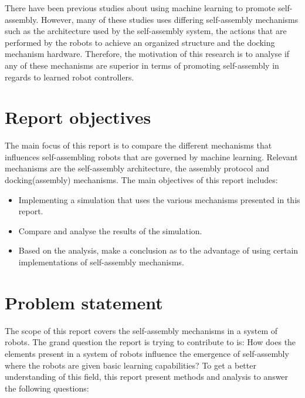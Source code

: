 There have been previous studies about using machine learning to promote self-assembly\cite{trianni_evolving_2004}\cite{montanier_adaptive_2014}\cite{li_co-evolution_2015}. 
However, many of these studies uses differing self-assembly mechanisms such as the architecture used by the self-assembly system, the actions that are performed by the robots to achieve an organized structure and the docking mechanism hardware.
Therefore, the motivation of this research is to analyse if any of these mechanisms are superior in terms of promoting self-assembly in regards to learned robot controllers.

\section{Report objectives}
The main focus of this report is to compare the different mechanisms that influences self-assembling robots that are governed by machine learning. 
Relevant mechanisms are the self-assembly architecture, the assembly protocol and docking(assembly) mechanisms. 
The main objectives of this report includes:

\begin{itemize}

\item Implementing a simulation that uses the various mechanisms presented in this report.

\item Compare and analyse the results of the simulation. 

\item Based on the analysis, make a conclusion as to the advantage of using certain implementations of self-assembly mechanisms.

\end{itemize}

\section{Problem statement}
The scope of this report covers the self-assembly mechanisms in a system of robots. 
The grand question the report is trying to contribute to is: How does the elements present in a system of robots influence the emergence of self-assembly where the robots are given basic learning capabilities?
To get a better understanding of this field, this report present methods and analysis to answer the following questions:

